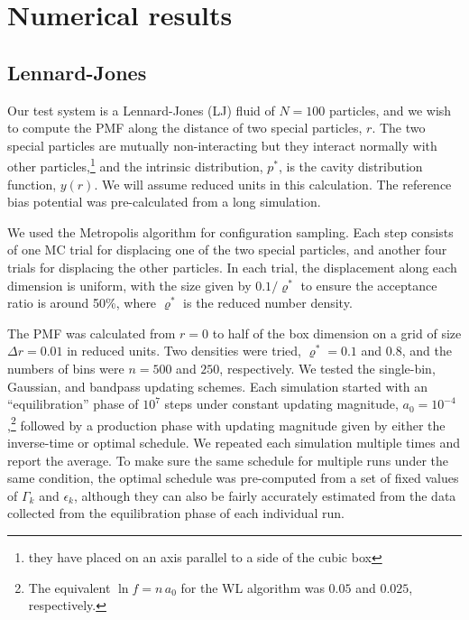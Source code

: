 \documentclass[reprint, superscriptaddress, floatfix]{revtex4-1}
\begin{document}
%
%




\section{\label{sec:results}
Numerical results}



\subsection{\label{sec:lj}Lennard-Jones}


Our test system is a Lennard-Jones (LJ) fluid of $N=100$ particles,
and we wish to compute the PMF along the distance of two special particles, $r$.
%
The two special particles are mutually non-interacting
but they interact normally with other particles,\footnote{they
have placed on an axis parallel to a side of the cubic box}
and the intrinsic distribution, $p^*$, is
the cavity distribution function, $y(r)$\cite{hansen}.
%
We will assume reduced units in this calculation.
%
The reference bias potential was pre-calculated from a long simulation.

We used the Metropolis algorithm\cite{frenkel, metropolis1953} for configuration sampling.
%
Each step consists of
one MC trial for displacing one of the two special particles,
and another four trials for displacing the other particles.
%
In each trial, the displacement along each dimension is uniform,
with the size given by $0.1/\varrho^*$ to ensure the acceptance ratio is around 50\%,
where $\varrho^*$ is the reduced number density.


The PMF was calculated from $r = 0$ to half of the box dimension
on a grid of size $\Delta r = 0.01$ in reduced units.
%
Two densities were tried, $\varrho^* = 0.1$ and $0.8$,
and the numbers of bins were $n = 500$ and $250$, respectively.
%
We tested the single-bin, Gaussian, and bandpass updating schemes.
%
Each simulation started with an ``equilibration'' phase
of $10^7$ steps under constant updating magnitude,
$a_0 = 10^{-4}$,\footnote{The equivalent $\ln f = n \, a_0$ for the WL algorithm
was $0.05$ and $0.025$, respectively.}
followed by a production phase
with updating magnitude given by
either the inverse-time or optimal schedule.
%
We repeated each simulation multiple times
and report the average.
%
To make sure the same schedule for multiple runs under the same condition,
the optimal schedule was pre-computed from a set of fixed values of
$\Gamma_k$ and $\epsilon_k$,
although they can also be fairly accurately estimated from the data
collected from the equilibration phase of each individual run.
\end{document}
